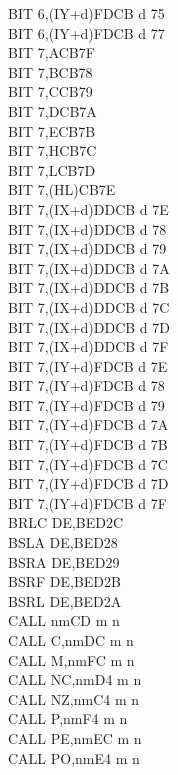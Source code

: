 \documentclass[12pt,twoside,openright,a4paper]{book}
\begin{document}
\begin{multicols}{3}
{\begin{tabbing}
		BIT 6,(IY+d)\UNDOC\>FDCB d 75\\
		BIT 6,(IY+d)\UNDOC\>FDCB d 77\\
		BIT 7,A\>CB7F\\
		BIT 7,B\>CB78\\
		BIT 7,C\>CB79\\
		BIT 7,D\>CB7A\\
		BIT 7,E\>CB7B\\
		BIT 7,H\>CB7C\\
		BIT 7,L\>CB7D\\
		BIT 7,(HL)\>CB7E\\
		BIT 7,(IX+d)\>DDCB d 7E\\
		BIT 7,(IX+d)\UNDOC\>DDCB d 78\\
		BIT 7,(IX+d)\UNDOC\>DDCB d 79\\
		BIT 7,(IX+d)\UNDOC\>DDCB d 7A\\
		BIT 7,(IX+d)\UNDOC\>DDCB d 7B\\
		BIT 7,(IX+d)\UNDOC\>DDCB d 7C\\
		BIT 7,(IX+d)\UNDOC\>DDCB d 7D\\
		BIT 7,(IX+d)\UNDOC\>DDCB d 7F\\
		BIT 7,(IY+d)\>FDCB d 7E\\
		BIT 7,(IY+d)\UNDOC\>FDCB d 78\\
		BIT 7,(IY+d)\UNDOC\>FDCB d 79\\
		BIT 7,(IY+d)\UNDOC\>FDCB d 7A\\
		BIT 7,(IY+d)\UNDOC\>FDCB d 7B\\
		BIT 7,(IY+d)\UNDOC\>FDCB d 7C\\
		BIT 7,(IY+d)\UNDOC\>FDCB d 7D\\
		BIT 7,(IY+d)\UNDOC\>FDCB d 7F\\
		BRLC DE,B\ZXN\>ED2C\\
		BSLA DE,B\ZXN\>ED28\\
		BSRA DE,B\ZXN\>ED29\\
		BSRF DE,B\ZXN\>ED2B\\
		BSRL DE,B\ZXN\>ED2A\\
		CALL nm\>CD m n\\
		CALL C,nm\>DC m n\\
		CALL M,nm\>FC m n\\
		CALL NC,nm\>D4 m n\\
		CALL NZ,nm\>C4 m n\\
		CALL P,nm\>F4 m n\\
		CALL PE,nm\>EC m n\\
		CALL PO,nm\>E4 m n\\

\end{tabbing}}
\end{multicols}
\end{document}
